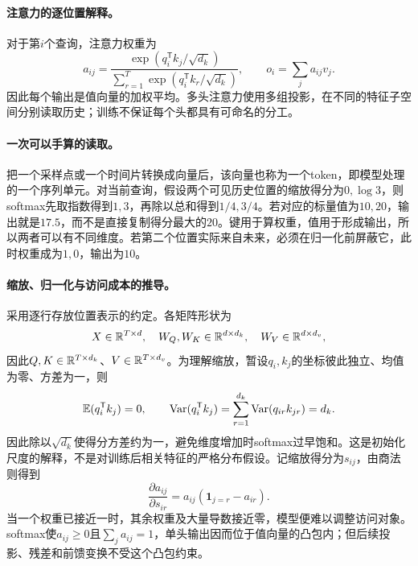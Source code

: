 \paragraph{注意力的逐位置解释。}
对于第$i$个查询，注意力权重为
\begin{equation}
 a_{ij}=\frac{\exp(q_i^{\mathsf T}k_j/\sqrt{d_k})}{\sum_{r=1}^{T}\exp(q_i^{\mathsf T}k_r/\sqrt{d_k})},
 \qquad o_i=\sum_j a_{ij}v_j.
\end{equation}
因此每个输出是值向量的加权平均。多头注意力使用多组投影，在不同的特征子空间分别读取历史；训练不保证每个头都具有可命名的分工。

\paragraph{一次可以手算的读取。}
把一个采样点或一个时间片转换成向量后，该向量也称为一个token，即模型处理的一个序列单元。对当前查询，假设两个可见历史位置的缩放得分为$0,\log3$，则softmax先取指数得到$1,3$，再除以总和得到$1/4,3/4$。若对应的标量值为$10,20$，输出就是$17.5$，而不是直接复制得分最大的$20$。键用于算权重，值用于形成输出，所以两者可以有不同维度。若第二个位置实际来自未来，必须在归一化前屏蔽它，此时权重成为$1,0$，输出为$10$。

\paragraph{缩放、归一化与访问成本的推导。}
采用逐行存放位置表示的约定。各矩阵形状为
\begin{equation}
 X\in\mathbb{R}^{T\times d},\quad W_Q,W_K\in\mathbb{R}^{d\times d_k},\quad W_V\in\mathbb{R}^{d\times d_v},
\end{equation}
因此$Q,K\in\mathbb{R}^{T\times d_k}$、$V\in\mathbb{R}^{T\times d_v}$。为理解缩放，暂设$q_i,k_j$的坐标彼此独立、均值为零、方差为一，则
\begin{equation}
 \mathbb{E}(q_i^{\mathsf T}k_j)=0,\qquad
 \operatorname{Var}(q_i^{\mathsf T}k_j)=\sum_{r=1}^{d_k}\operatorname{Var}(q_{ir}k_{jr})=d_k.
\end{equation}
因此除以$\sqrt{d_k}$使得分方差约为一，避免维度增加时softmax过早饱和。这是初始化尺度的解释，不是对训练后相关特征的严格分布假设。记缩放得分为$s_{ij}$，由商法则得到
\begin{equation}
 \frac{\partial a_{ij}}{\partial s_{ir}}=a_{ij}(\mathbf1_{j=r}-a_{ir}).
\end{equation}
当一个权重已接近一时，其余权重及大量导数接近零，模型便难以调整访问对象。softmax使$a_{ij}\geq0$且$\sum_j a_{ij}=1$，单头输出因而位于值向量的凸包内；但后续投影、残差和前馈变换不受这个凸包约束。


